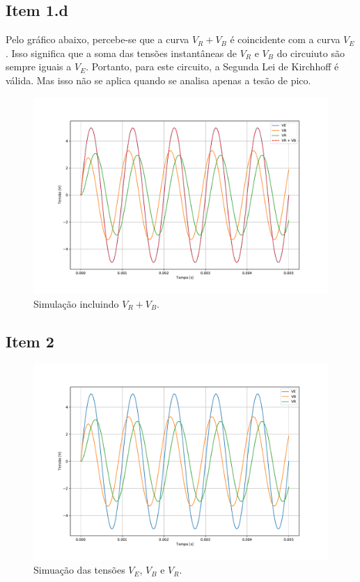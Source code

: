 \documentclass[11pt]{article}
\begin{document}
\subsection*{Item 1.d}

Pelo gráfico abaixo, percebe-se que a curva $V_{R} + V_{B}$ é coincidente com a curva $V_{E}$. Isso significa que a soma das tensões instantâneas de $V_{R}$ e $V_{B}$ do circuiuto são sempre iguais a $V_{E}$. Portanto, para este circuito, a Segunda Lei de Kirchhoff é válida. Mas isso não se aplica quando se analisa apenas a tesão de pico.

\begin{figure}[h!]
  \centering
  \includegraphics[width=.88\textwidth]{fig/1d.pdf}
  \caption{Simulação incluindo $V_{R} + V_{B}$.}
\end{figure}

\pagebreak

\subsection*{Item 2}

\begin{figure}[h!]
  \centering
  \includegraphics[width=.88\textwidth]{fig/2.pdf}
  \caption{Simuação das tensões $V_{E}$, $V_{B}$ e $V_{R}$.}
  \label{fig:2}
\end{figure}
\end{document}
